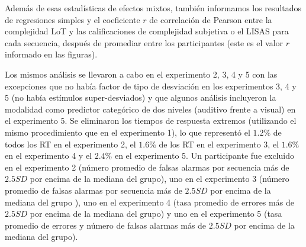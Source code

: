 
Además de esas estadísticas de efectos mixtos, también informamos los resultados de regresiones simples y el coeficiente $r$ de correlación de Pearson entre la complejidad LoT y las calificaciones de complejidad subjetiva o el LISAS para cada secuencia, después de promediar entre los participantes (este es el valor $r$ informado en las figuras). %


Los mismos análisis se llevaron a cabo en el experimento 2, 3, 4 y 5 con las excepciones que no había factor de tipo de desviación en los experimentos 3, 4 y 5 (no había estímulos super-desviados) y que algunos análisis incluyeron la modalidad como predictor categórico de dos niveles (auditivo frente a visual) en el experimento 5. Se eliminaron los tiempos de respuesta extremos (utilizando el mismo procedimiento que en el experimento 1), lo que representó el $1.2\%$ de todos los RT en el experimento 2, el $1.6\%$ de los RT en el experimento 3, el $1.6\%$ en el experimento 4 y el $2.4\%$ en el experimento 5. Un participante fue excluido en el experimento 2 (número promedio de falsas alarmas por secuencia más de $2.5 SD$ por encima de la mediana del grupo), uno en el experimento 3 (número promedio de falsas alarmas por secuencia más de $2.5 SD$ por encima de la mediana del grupo ), uno en el experimento 4 (tasa promedio de errores más de $2.5 SD$ por encima de la mediana del grupo) y uno en el experimento 5 (tasa promedio de errores y número de falsas alarmas más de $2.5 SD$ por encima de la mediana del grupo).

